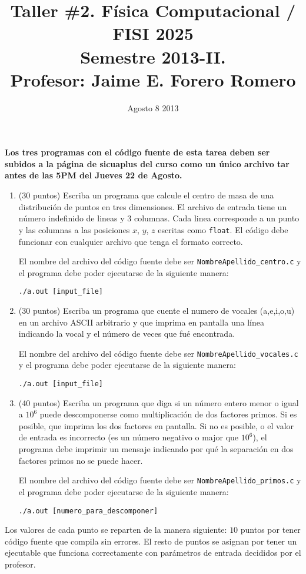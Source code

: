 \documentclass{article}
\title{Taller \#2. F\'isica Computacional / FISI 2025 \\Semestre 2013-II. \\ Profesor: Jaime E. Forero Romero}
\date{Agosto 8 2013}
\begin{document}
\maketitle

{\bf Los tres programas con el c\'odigo fuente de esta tarea deben ser subidos a la p\'agina de sicuaplus del curso como un \'unico archivo tar antes de las 5PM del Jueves 22 de Agosto.}

\begin{enumerate}


\item (30 puntos) Escriba un programa que calcule el centro de masa de una distribuci\'on de puntos en tres dimensiones. El archivo de entrada tiene un n\'umero indefinido de lineas y 3 columnas. Cada linea corresponde a un punto y las columnas a las posiciones $x$, $y$, $z$ escritas como \verb"float". El c\'odigo debe funcionar con cualquier archivo que tenga el formato correcto. 

El nombre del archivo del c\'odigo fuente debe ser \verb"NombreApellido_centro.c" y el programa debe poder ejecutarse de la siguiente manera:

\begin{verbatim}
./a.out [input_file]
\end{verbatim}

\item (30 puntos) Escriba un programa que cuente el numero de vocales (a,e,i,o,u) en un archivo ASCII arbitrario y que imprima en pantalla una l\'inea indicando la vocal y el n\'umero de veces que fu\'e encontrada.

El nombre del archivo del c\'odigo fuente debe ser \verb"NombreApellido_vocales.c" y el programa debe poder ejecutarse de la siguiente manera:

\begin{verbatim}
./a.out [input_file]
\end{verbatim}

\item (40 puntos) Escriba un programa que diga si un n\'umero entero menor o igual a $10^6$ puede descomponerse como multiplicaci\'on de dos factores primos. Si es posible, que imprima los dos factores en pantalla. Si no es posible, o el valor de entrada es incorrecto (es un n\'umero negativo o major que $10^6$), el programa debe imprimir un mensaje indicando por qu\'e la separaci\'on en dos factores primos no se puede hacer.


El nombre del archivo del c\'odigo fuente debe ser \verb"NombreApellido_primos.c" y el programa debe poder ejecutarse de la siguiente manera:

\begin{verbatim}
./a.out [numero_para_descomponer]
\end{verbatim}


\end{enumerate}

Los valores de cada punto se reparten de la manera siguiente: $10$ puntos por tener c\'odigo fuente que compila sin errores. El resto de puntos se asignan por tener un ejecutable que funciona correctamente con par\'ametros de entrada decididos por el profesor.
\end{document}
